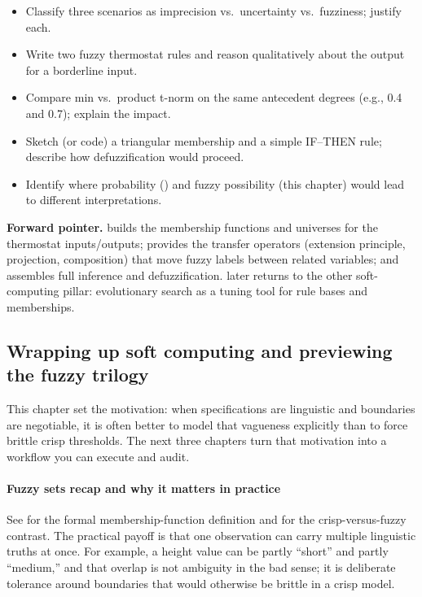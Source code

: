 \begin{tcolorbox}[summarybox, title={Exercises (\Cref{chap:softcomp})}]
\begin{itemize}
    \item Classify three scenarios as imprecision vs.\ uncertainty vs.\ fuzziness; justify each.
    \item Write two fuzzy thermostat rules and reason qualitatively about the output for a borderline input.
    \item Compare min vs.\ product t\hyp{}norm on the same antecedent degrees (e.g., 0.4 and 0.7); explain the impact.
    \item Sketch (or code) a triangular membership and a simple IF--THEN rule; describe how defuzzification would proceed.
    \item Identify where probability () and fuzzy possibility (this chapter) would lead to different interpretations.
\end{itemize}
\end{tcolorbox}

\noindent\textbf{Forward pointer.}  builds the membership functions and universes for the thermostat inputs/outputs;  provides the transfer operators (extension principle, projection, composition) that move fuzzy labels between related variables; and  assembles full inference and defuzzification.  later returns to the other soft-computing pillar: evolutionary search as a tuning tool for rule bases and memberships.


\subsection{Wrapping up soft computing and previewing the fuzzy trilogy}
\label{sec:softcomp_wrapping_up_fuzzy_sets_and_fuzzy_logic}

This chapter set the motivation: when specifications are linguistic and boundaries are negotiable, it is often better to model that vagueness explicitly than to force brittle crisp thresholds. The next three chapters turn that motivation into a workflow you can execute and audit.

\paragraph{Fuzzy sets recap and why it matters in practice}
See  for the formal membership-function definition and  for the crisp-versus-fuzzy contrast. The practical payoff is that one observation can carry multiple linguistic truths at once. For example, a height value can be partly ``short'' and partly ``medium,'' and that overlap is not ambiguity in the bad sense; it is deliberate tolerance around boundaries that would otherwise be brittle in a crisp model.

